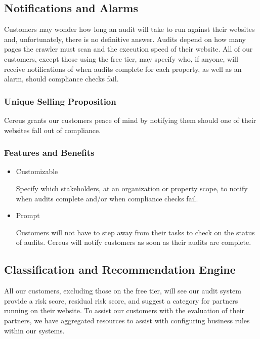 \subsection{Notifications and Alarms}

Customers may wonder how long an audit will take to run against their websites and, unfortunately, there is no definitive answer. Audits depend on how many pages the crawler must scan and the execution speed of their website. All of our customers, except those using the free tier, may specify who, if anyone, will receive notifications of when audits complete for each property, as well as an alarm, should compliance checks fail.

\subsubsection*{Unique Selling Proposition}

Cereus grants our customers peace of mind by notifying them should one of their websites fall out of compliance.

\subsubsection*{Features and Benefits}

\begin{itemize}

\item Customizable

  Specify which stakeholders, at an organization or property scope, to notify when audits complete and/or when compliance checks fail.

\item Prompt

  Customers will not have to step away from their tasks to check on the status of audits. Cereus will notify customers as soon as their audits are complete.

\end{itemize}


\subsection{Classification and Recommendation Engine}

All our customers, excluding those on the free tier, will see our audit system provide a risk score, residual risk score, and suggest a category for partners running on their website. To assist our customers with the evaluation of their partners, we have aggregated resources to assist with configuring business rules within our systems.

